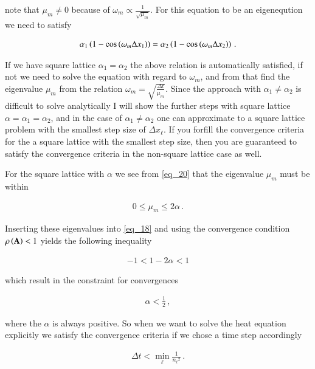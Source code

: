 \documentclass[11pt,english,a4paper]{article}
\begin{document}
\begin{flushleft}
note that $\mu_m\neq 0$ because of $\omega_{m} \propto \frac{1}{\sqrt{\mu_m}}$. For this equation to be an eigeneqution we need to satisfy

\begin{align*}
\alpha_1 \left({1-\cos\left({\omega_m \Delta x_1}\right)}\right) = \alpha_2\left({1-\cos\left({\omega_m \Delta x_2}\right)}\right)\,.
\end{align*}

If we have square lattice $\alpha_1 = \alpha_2$ the above relation is automatically satisfied, if not we need to solve the equation with regard to $\omega_m$, and from that find the eigenvalue $\mu_m$ from the relation $\omega_m = \sqrt{\frac{\Delta t}{\mu_m}}$. Since the approach with $\alpha_1 \neq \alpha_2$ is difficult to solve analytically I will show the further steps with square lattice $\alpha = \alpha_1 = \alpha_2$, and in the case of $\alpha_1 \neq \alpha_2$ one can approximate to a square lattice problem with the smallest step size of $\Delta x_\ell$. If you forfill the convergence criteria for the a square lattice with the smallest step size, then you are guaranteed to satisfy the convergence criteria in the non-square lattice case as well. \linebreak

For the square lattice with $\alpha$ we see from \eqref{eq_20} that the eigenvalue $\mu_m$ must be within

\begin{align*}
0 \leq \mu_m \leq 2\alpha \,.
\end{align*}


Inserting these eigenvalues into \eqref{eq_18} and using the convergence condition $\rho\left({\textbf{A}}\right) < 1$ yields the following inequality

\begin{align*}
-1 < 1 - 2\alpha < 1
\end{align*}

which result in the constraint for convergences

\begin{align*}
\alpha < \frac{1}{2} \,,
\end{align*}

where the $\alpha$ is always positive. So when we want to solve the heat equation explicitly we satisfy the convergence criteria if we chose a time step accordingly

\begin{align}
\Delta t < \min_\ell \frac{1}{{n_\ell}^2} \,.
\label{eq_21}
\end{align}


\end{flushleft}
\end{document}

